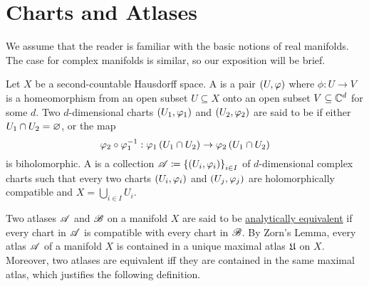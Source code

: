 \documentclass[../Moduli_Spaces_of_Riemann_Surfaces.tex]{subfiles}
\begin{document}
    \section{Charts and Atlases}
    We assume that the reader is familiar with the basic notions of real manifolds. The case for complex manifolds is similar, so our exposition will be brief.
    \begin{definition}
        Let $X$ be a second-countable Hausdorff space. A   is a pair $\tpl{U,\phi}$ where $\phi:U\to V$ is a homeomorphism from an open subset $U\subseteq X$ onto an open subset $V\subseteq\C^d$ for some $d$. Two $d$-dimensional charts $\l(U_1,\phi_1\r)$ and $\l(U_2,\phi_2\r)$ are said to be  if either $U_1\cap U_2=\em$, or the map
        \begin{equation*}
            \phi_2\circ\phi_1^{-1}:\phi_1\l(U_1\cap U_2\r)\to\phi_2\l(U_1\cap U_2\r)
        \end{equation*}
        is biholomorphic. A  is a collection $\ms{A}\coloneqq\l\{\l(U_i,\phi_i\r)\r\}_{i\in I}$ of $d$-dimensional complex charts such that every two charts $\l(U_i,\phi_i\r)$ and $\l(U_j,\phi_j\r)$ are holomorphically compatible and $X=\bigcup_{i\in I}U_i$.
    \end{definition}
    \begin{remark}
        Two atlases $\ms{A}$ and $\ms{B}$ on a manifold $X$ are said to be \ul{analytically equivalent} if every chart in $\ms{A}$ is compatible with every chart in $\ms{B}$. By Zorn's Lemma, every atlas $\ms{A}$ of a manifold $X$ is contained in a unique maximal atlas $\mf{U}$ on $X$. Moreover, two atlases are equivalent iff they are contained in the same maximal atlas, which justifies the following definition.\exqed
    \end{remark}
\end{document}
